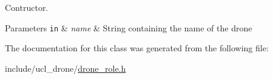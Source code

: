 Contructor. 


\begin{DoxyParams}[1]{Parameters}
\mbox{\tt in}  & {\em name} & String containing the name of the drone \\
\hline
\end{DoxyParams}


The documentation for this class was generated from the following file\+:\begin{DoxyCompactItemize}
\item 
include/ucl\+\_\+drone/\hyperlink{drone__role_8h}{drone\+\_\+role.\+h}\end{DoxyCompactItemize}
